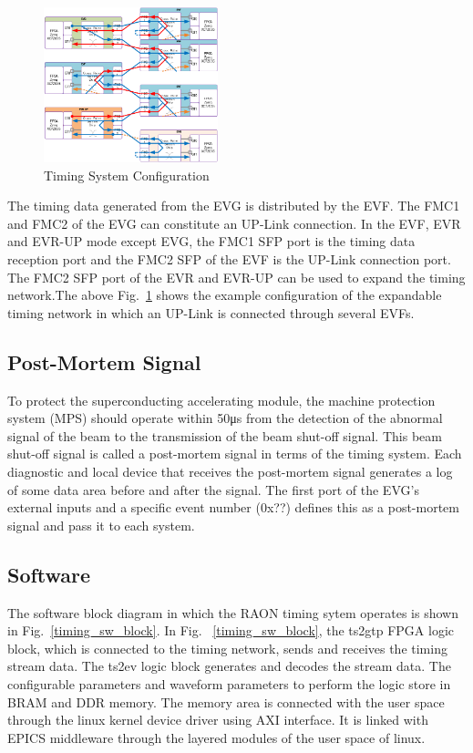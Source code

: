 \documentclass[journal,reqno]{IEEEtran}
\begin{document}
\begin{figure}[!htb]
	\centering
	\includegraphics*[width=0.45\textwidth, height=0.4\textwidth]{img14.png}
	\caption{Timing System Configuration}
	\label{timing_conf}
\end{figure}
The timing data generated from the EVG is distributed by the EVF. The FMC1 and FMC2 of the EVG can constitute an UP-Link connection. In the EVF, EVR and EVR-UP mode except EVG, the FMC1 SFP port is the timing data reception port and the FMC2 SFP of the EVF is the UP-Link connection port. The FMC2 SFP port of the EVR and EVR-UP can be used to expand the timing network.The above Fig.~\ref{timing_conf} shows the example configuration of the expandable timing network in which an UP-Link is connected through several EVFs.

\subsection{Post-Mortem Signal}
To protect the superconducting accelerating module, the machine protection system (MPS) should operate within 50μs from the detection of the abnormal signal of the beam to the transmission of the beam shut-off signal. This beam shut-off signal is called a post-mortem signal in terms of the timing system. Each diagnostic and local device that receives the post-mortem signal generates a log of some data area before and after the signal. The first port of the EVG's external inputs and a specific event number (0x??) defines this as a post-mortem signal and pass it to each system.

\subsection{Software}
The software block diagram in which the RAON timing sytem operates is shown in Fig.~\ref{timing_sw_block}. In Fig. ~\ref{timing_sw_block}, the ts2gtp FPGA logic block, which is connected to the timing network, sends and receives the timing stream data. The ts2ev logic block generates and decodes the stream data. The configurable parameters and waveform parameters to perform the logic store in BRAM and DDR memory.  The memory area is connected with the user space through the linux kernel device driver using AXI interface. It is linked with EPICS middleware through the layered modules of the user space of linux.
\end{document}
